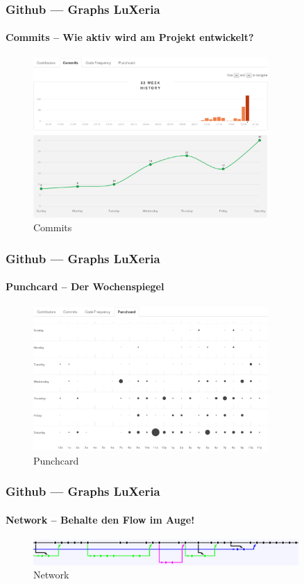 \begin{frame}
    \frametitle{Github --- Graphs \hfill{} \footnotesize{LuXeria}}
    \framesubtitle{Commits -- Wie aktiv wird am Projekt entwickelt? }
    \begin{figure}
        \includegraphics[width=0.8\textwidth]{github_commits.pdf}
        \caption{Commits}
    \end{figure}
\end{frame}

\begin{frame}
    \frametitle{Github --- Graphs \hfill{} \footnotesize{LuXeria}}
    \framesubtitle{Punchcard -- Der Wochenspiegel}
        \begin{figure}
            \includegraphics[width=0.8\textwidth]{github_punchcard.pdf}
            \caption{Punchcard}
        \end{figure}
\end{frame}

\begin{frame}
    \frametitle{Github --- Graphs \hfill{} \footnotesize{LuXeria}}
    \framesubtitle{Network -- Behalte den Flow im Auge!}
        \begin{figure}
            \includegraphics[width=0.9\textwidth]{github_network.pdf}
            \caption{Network}
        \end{figure}
\end{frame}

